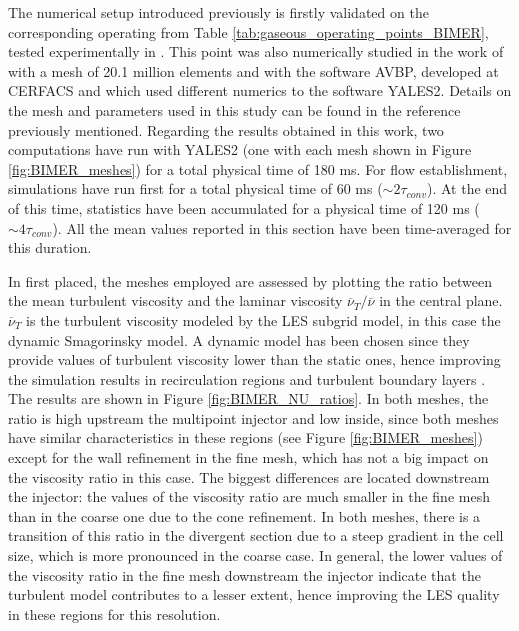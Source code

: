 The numerical setup introduced previously is firstly validated on the corresponding operating from Table \ref{tab:gaseous_operating_points_BIMER}, tested experimentally in . This point was also numerically studied in the work of  with a mesh of 20.1 million elements and with the software AVBP, developed at CERFACS  and which used different numerics to the software YALES2. Details on the mesh and parameters used in this study can be found in the reference previously mentioned. Regarding the results obtained in this work, two computations have run with YALES2 (one with each mesh shown in Figure \ref{fig:BIMER_meshes}) for a total physical time of 180 ms. For flow establishment, simulations have run first for a total physical time of 60 ms ($\sim 2 \tau_{conv}$). At the end of this time, statistics have been accumulated for a physical time of 120 ms ($\sim 4 \tau_{conv}$). All the mean values reported in this section have been time-averaged for this duration.

In first placed, the meshes employed are assessed by plotting the ratio between the mean turbulent viscosity and the laminar viscosity $\overline{\nu}_T / \overline{\nu}$ in the central plane. $\overline{\nu}_T$ is the turbulent viscosity modeled by the LES subgrid model, in this case the dynamic Smagorinsky model. A dynamic model has been chosen since they provide values of turbulent viscosity lower than the static ones, hence improving the simulation results in recirculation regions and turbulent boundary layers . The results are shown in Figure \ref{fig:BIMER_NU_ratios}. In both meshes, the ratio is high upstream the multipoint injector and low inside, since both meshes have similar characteristics in these regions (see Figure \ref{fig:BIMER_meshes}) except for the wall refinement in the fine mesh, which has not a big impact on the viscosity ratio in this case. The biggest differences are located downstream the injector: the values of the viscosity ratio are much smaller in the fine mesh than in the coarse one due to the cone refinement. In both meshes, there is a transition of this ratio in the divergent section due to a steep gradient in the cell size, which is more pronounced in the coarse case. In general, the lower values of the viscosity ratio in the fine mesh downstream the injector indicate that the turbulent model contributes to a lesser extent, hence improving the LES quality in these regions for this resolution.


